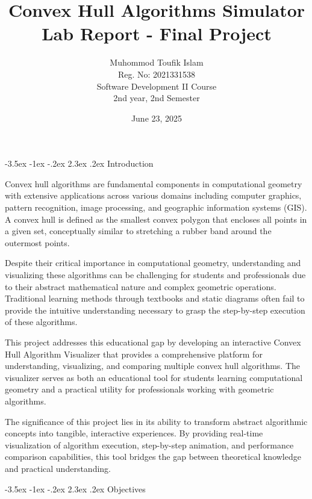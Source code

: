 \documentclass[12pt,a4paper]{article}
\title{\textbf{Convex Hull Algorithms Simulator} \\ \large{Lab Report - Final Project}}
\author{Muhommod Toufik Islam \\ Reg. No: 2021331538 \\ Software Development II Course \\ 2nd year, 2nd Semester}
\date{June 23, 2025}
\makeatletter
\renewcommand{\section}{\@startsection{section}{1}{\z@}%
  {-3.5ex \@plus -1ex \@minus -.2ex}%
  {2.3ex \@plus.2ex}%
  {\needspace{4\baselineskip}\normalfont\Large\bfseries}}
\makeatother
\begin{document}
\maketitle
\thispagestyle{empty}

\newpage
\setlength{\parskip}{0pt}
\renewcommand{\baselinestretch}{0.9}
\setlength{\itemsep}{0pt}
{
\small
\tableofcontents
}
\renewcommand{\baselinestretch}{1.0}
\setlength{\parskip}{6pt}
\newpage

\section{Introduction}

Convex hull algorithms are fundamental components in computational geometry with extensive applications across various domains including computer graphics, pattern recognition, image processing, and geographic information systems (GIS). A convex hull is defined as the smallest convex polygon that encloses all points in a given set, conceptually similar to stretching a rubber band around the outermost points.

Despite their critical importance in computational geometry, understanding and visualizing these algorithms can be challenging for students and professionals due to their abstract mathematical nature and complex geometric operations. Traditional learning methods through textbooks and static diagrams often fail to provide the intuitive understanding necessary to grasp the step-by-step execution of these algorithms.

This project addresses this educational gap by developing an interactive Convex Hull Algorithm Visualizer that provides a comprehensive platform for understanding, visualizing, and comparing multiple convex hull algorithms. The visualizer serves as both an educational tool for students learning computational geometry and a practical utility for professionals working with geometric algorithms.

The significance of this project lies in its ability to transform abstract algorithmic concepts into tangible, interactive experiences. By providing real-time visualization of algorithm execution, step-by-step animation, and performance comparison capabilities, this tool bridges the gap between theoretical knowledge and practical understanding.

\section{Objectives}
\end{document}

